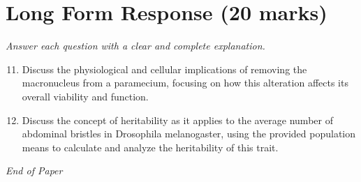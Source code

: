 \documentclass[12pt]{article}
\begin{document}
\section*{Long Form Response (20 marks)}
\textit{Answer each question with a clear and complete explanation.}
\begin{enumerate}[label=\arabic*.]
\setcounter{enumi}{10}
\item Discuss the physiological and cellular implications of removing the macronucleus from a paramecium, focusing on how this alteration affects its overall viability and function.
\item Discuss the concept of heritability as it applies to the average number of abdominal bristles in Drosophila melanogaster, using the provided population means to calculate and analyze the heritability of this trait.
\end{enumerate}

\vfill
\noindent\textit{End of Paper}
\end{document}
